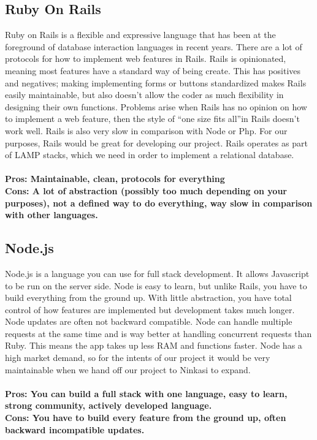 \documentclass[draftclsnofoot,onecolumn,letterpaper,10pt,compsoc]{IEEEtran}
\begin{document}
			\subsection{Ruby On Rails}
				Ruby on Rails is a flexible and expressive language that has been at the foreground of database interaction languages in recent years.
				There are a lot of protocols for how to implement web features in Rails.
				Rails is opinionated, meaning most features have a standard way of being create\cite{Medium}.
				This has positives and negatives; making implementing forms or buttons standardized makes Rails easily maintainable, but also doesn't allow the coder as much flexibility in designing their own functions.
				Problems arise when Rails has no opinion on how to implement a web feature, then the style of \textquotedblleft one size fits all\textquotedblright in Rails doesn't work well\cite{Medium}.
				Rails is also very slow in comparison with Node or Php\cite{Medium}.
				For our purposes, Rails would be great for developing our project.
				Rails operates as part of LAMP stacks, which we need in order to implement a relational database.
				\\ \\
				\textbf{Pros: Maintainable, clean, protocols for everything}
				\\
				\textbf{Cons: A lot of abstraction (possibly too much depending on your purposes), not a defined way to do everything, way slow in comparison with other languages.}

			\subsection{Node.js}
					Node.js is a language you can use for full stack development\cite{Medium}.
					It allows Javascript to be run on the server side\cite{Medium}.
					Node is easy to learn, but unlike Rails, you have to build everything from the ground up\cite{NetGuru}.
					With little abstraction, you have total control of how features are implemented but development takes much longer.
					Node updates are often not backward compatible.
					Node can handle multiple requests at the same time and is way better at handling concurrent requests than Ruby\cite{Medium}.
					This means the app takes up less RAM and functions faster.
					Node has a high market demand, so for the intents of our project it would be very maintainable when we hand off our project to Ninkasi to expand.
					\\ \\
					\textbf{Pros: You can build a full stack with one language, easy to learn, strong community, actively developed language.}
					\\
					\textbf{Cons: You have to build every feature from the ground up, often backward incompatible updates.}
\end{document}
